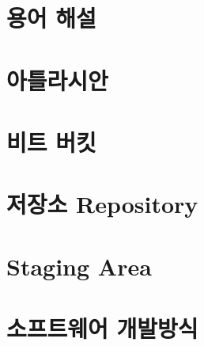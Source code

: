 \documentclass[12pt, a4paper, oneside]{book}
\let\stdsection\section
\renewcommand\section{\newpage\stdsection}
\begin{document}
	\section 	{용어 해설}


%										
	\section 	{아틀라시안}



%										
	\section 	{비트 버킷}


%										
	\section 	{저장소 Repository}


%										
	\section 	{Staging Area}



%										
	\section 	{소프트웨어 개발방식}



%										
\end{document}
